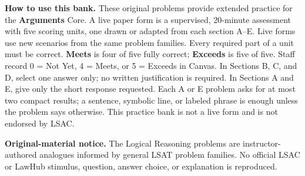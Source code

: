 \documentclass[10pt]{extarticle}
\begin{document}
\small

\textbf{How to use this bank.} These original problems provide extended practice for the
\textbf{Arguments} Core. A live paper form is a supervised, 20-minute assessment
with five scoring units, one drawn or adapted from each section A--E. Live forms
use new scenarios from the same problem families. Every required part of a unit
must be correct. \textbf{Meets} is four of five fully correct; \textbf{Exceeds}
is five of five. Staff record 0 = Not Yet, 4 = Meets, or 5 = Exceeds in Canvas.
In Sections B, C, and D, select one answer only; no written justification is
required. In Sections A and E, give only the short response requested. Each A or
E problem asks for at most two compact results; a sentence, symbolic line, or
labeled phrase is enough unless the problem says otherwise. This practice bank
is not a live form and is not endorsed by LSAC.

\textbf{Original-material notice.} The Logical Reasoning problems are
instructor-authored analogues informed by general LSAT problem families. No
official LSAC or LawHub stimulus, question, answer choice, or explanation is
reproduced.
\end{document}
